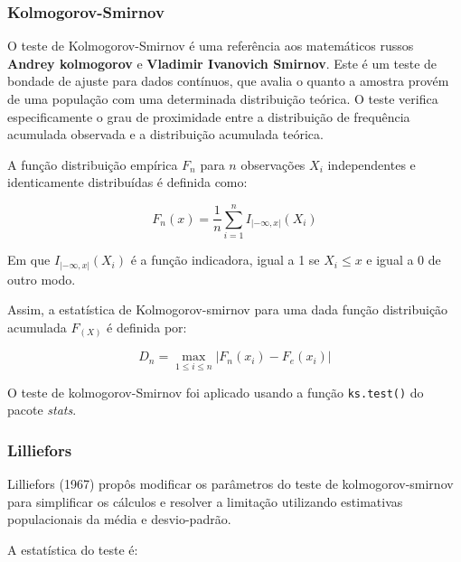 \documentclass[a4paper,11pt]{article} %
\begin{document}
\subsubsection{Kolmogorov-Smirnov}

O teste de Kolmogorov-Smirnov é uma referência aos matemáticos russos \textbf{Andrey kolmogorov} e \textbf{Vladimir Ivanovich Smirnov}. Este é um teste de bondade de ajuste para dados contínuos, que avalia o quanto a amostra provém de uma população com uma determinada distribuição teórica. O teste verifica especificamente o grau de proximidade entre a distribuição de frequência acumulada observada e a distribuição acumulada teórica.  

\vspace{0.5cm}

A função distribuição empírica $F_{n}$ para $n$ observações $X_{i}$ independentes e identicamente distribuídas é definida como:

\begin{equation}
    F_{n}(x) = \frac{1}{n} \sum_{i=1}^{n}I_{|- \infty, x|}(X_{i})
\end{equation}

Em que $I_{|- \infty, x|}(X_{i})$ é a função indicadora, igual a 1 se $X_{i} \leq  x$ e igual a 0 de outro modo.

\vspace{0.5cm}

Assim, a  estatística de Kolmogorov-smirnov para uma dada função distribuição acumulada $F_{(X)}$ é definida por:

\begin{equation}
    D_{n} = \max_{1 \leq i \leq n} \left| F_{n}(x_i) - F_{e}(x_i) \right|
\end{equation}

O teste de kolmogorov-Smirnov foi aplicado usando a função \texttt{ks.test()} do pacote \textit{stats}.

\subsubsection{Lilliefors}

Lilliefors (1967) propôs modificar os parâmetros do teste de kolmogorov-smirnov para simplificar os cálculos e resolver a limitação utilizando estimativas populacionais da média e desvio-padrão.

\vspace{0.5cm}

A estatística do teste é:
\end{document}
